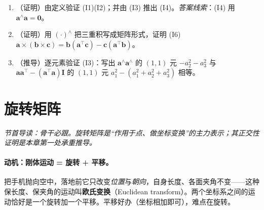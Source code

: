 \begin{practice}
\begin{enumerate}
  \item （证明）由定义验证 (I1)(I2)；并由 (I3) 推出 (I4)。\emph{答案线索}：(I4) 用 $\mathbf{a}^\wedge\mathbf{a}=\mathbf{0}$。
  \item （证明）用 $(\cdot)^\wedge$ 把三重积写成矩阵形式，证明 (I6) $\mathbf{a}\times(\mathbf{b}\times\mathbf{c})=\mathbf{b}(\mathbf{a}^\top\mathbf{c})-\mathbf{c}(\mathbf{a}^\top\mathbf{b})$。
  \item （推导）逐元素验证 (I3)：写出 $\mathbf{a}^\wedge\mathbf{a}^\wedge$ 的 $(1,1)$ 元 $-a_2^2-a_3^2$ 与 $\mathbf{a}\mathbf{a}^\top-(\mathbf{a}^\top\mathbf{a})\mathbf{I}$ 的 $(1,1)$ 元 $a_1^2-(a_1^2+a_2^2+a_3^2)$ 相等。
\end{enumerate}
\end{practice}

\section{旋转矩阵}
\label{sec:rb-rotation}
\noindent\emph{节首导读：骨干必跟。旋转矩阵是“作用于点、做坐标变换”的主力表示；其正交性证明是本章第一处承重推导。}

\paragraph{动机：刚体运动 = 旋转 + 平移。}
把手机抛向空中，落地前它只改变\emph{位置}与\emph{朝向}，自身长度、各面夹角不变——这种保长度、保夹角的运动叫\textbf{欧氏变换}（Euclidean transform）\cite{gaoxiang2019slam14}。两个坐标系之间的运动恰好是一个旋转加一个平移。平移好办（坐标相加即可），难点在旋转。

